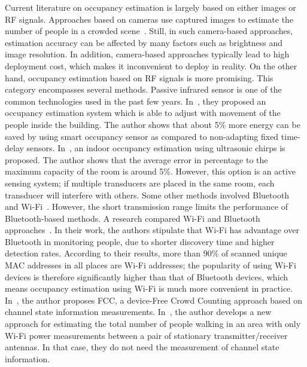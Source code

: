 Current literature on occupancy estimation is largely based on either images or RF signals.
Approaches based on cameras use captured images to estimate the number of people in a crowded scene~\cite{Ma_2013_CVPR,Pe_count,li2008estimating}.
Still, in such camera-based approaches, estimation accuracy can be affected by many factors such as brightness and image resolution.
In addition, camera-based approaches typically lead to high deployment cost, which makes it inconvenient to deploy in reality.
On the other hand, occupancy estimation based on RF signals is more promising.
This category encompasses several methods. 
Passive infrared sensor is one of the common technologies used in the past few years.
In~\cite{Garg200081}, they proposed an occupancy estimation system which is able to adjust with movement of the people inside the building.
The author shows  that about 5\% more energy can be saved by using smart occupancy sensor as compared to non-adapting fixed time-delay sensors.
In~\cite{Shih:2015:OEU:2735960.2735969}, an indoor occupancy estimation using ultrasonic chirps is proposed.
The author shows that the average error in percentage to the maximum capacity of the room is around 5\%.
However, this option is an active sensing system; if multiple transducers are placed in the same room, each transducer will interfere with others.
Some other methods involved Bluetooth~\cite{B_ad_hoc} and Wi-Fi~\cite{W_power}. However, the short transmission range limits the performance of Bluetooth-based methods.
A research compared Wi-Fi and Bluetooth approaches~\cite{quteprints71808}.
In their work, the authors stipulate that Wi-Fi has advantage over Bluetooth in monitoring people, due to shorter discovery time and higher detection rates.
According to their results, more than 90\% of scanned unique MAC addresses in all places are Wi-Fi addresses; the popularity of using Wi-Fi devices is therefore significantly higher than that of Bluetooth devices, which means occupancy estimation using Wi-Fi is much more convenient in practice.
In~\cite{6847958}, the author proposes FCC, a device-Free Crowd Counting approach based on channel state information measurements.
In~\cite{7102673}, the author develops a new approach for estimating the total number of people walking in an area with only Wi-Fi power measurements between a pair of stationary transmitter/receiver antennas.
In that case, they do not need the measurement of channel state information.

